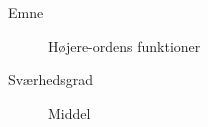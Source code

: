 \begin{description}
\item[Emne] Højere-ordens funktioner
\item[Sværhedsgrad] Middel
\end{description}
